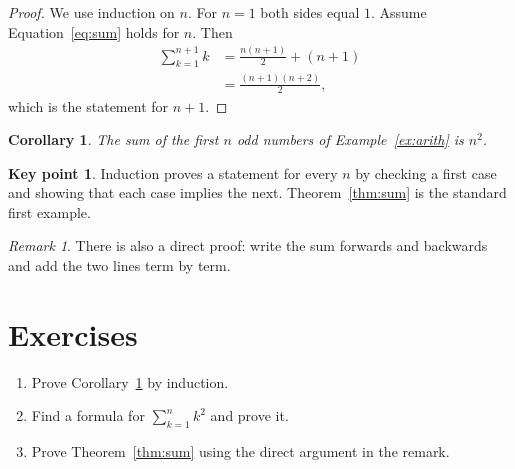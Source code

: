 \documentclass[11pt, a4paper]{article}
\theoremstyle{plain}
\newtheorem{corollary}[theorem]{Corollary}
\theoremstyle{definition}
\newtheorem*{keypoint}{Key point}
\theoremstyle{remark}
\newtheorem*{remark}{Remark}
\numberwithin{equation}{section}
\begin{document}
\begin{proof}
We use induction on $n$. For $n = 1$ both sides equal $1$. Assume
Equation~\eqref{eq:sum} holds for $n$. Then
\begin{align}
  \sum_{k=1}^{n+1} k &= \frac{n(n+1)}{2} + (n + 1) \\
  &= \frac{(n+1)(n+2)}{2} ,
\end{align}
which is the statement for $n + 1$.
\end{proof}

\begin{corollary}
\label{cor:odd}
The sum of the first $n$ odd numbers of Example~\ref{ex:arith} is $n^2$.
\end{corollary}

\begin{keypoint}
Induction proves a statement for every $n$ by checking a first case and
showing that each case implies the next. Theorem~\ref{thm:sum} is the
standard first example.
\end{keypoint}

\begin{remark}
There is also a direct proof: write the sum forwards and backwards and
add the two lines term by term.
\end{remark}

\section{Exercises}
\label{sec:exercises}

\begin{enumerate}[label=\arabic*.]
  \item Prove Corollary~\ref{cor:odd} by induction.
  \item Find a formula for $\sum_{k=1}^{n} k^2$ and prove it.
  \item Prove Theorem~\ref{thm:sum} using the direct argument in the remark.
\end{enumerate}
\end{document}
